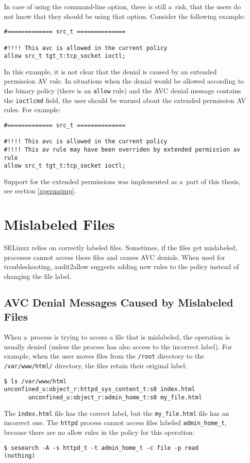 In case of using the command-line option, there is still a~risk, that the users
do not know that they should be using that option. Consider the following
example:
\begin{lstlisting}
#============= src_t ==============

#!!!! This avc is allowed in the current policy
allow src_t tgt_t:tcp_socket ioctl;
\end{lstlisting}
In this example, it is not clear that the denial is caused by an extended
permission AV rule. In situations when the denial would be allowed according to
the binary policy (there is an \texttt{allow} rule) and the AVC denial message
contains the \texttt{ioctlcmd} field, the user should be warned about the
extended permission AV rules. For example:
\begin{lstlisting}
#============= src_t ==============

#!!!! This avc is allowed in the current policy
#!!!! This av rule may have been overriden by extended permission av rule
allow src_t tgt_t:tcp_socket ioctl;
\end{lstlisting}
Support for the extended permissions was implemented as a~part of this thesis,
see section \ref{xpermsimp}.

\section{Mislabeled Files}
\label{mislabeled}
SELinux relies on correctly labeled files. Sometimes, if the files get
mislabeled, processes cannot access these files and causes AVC denials. When
used for troubleshooting, audit2allow suggests adding new rules to the policy
instead of changing the file label.

\subsection{AVC Denial Messages Caused by Mislabeled Files}
When a~process is trying to access a file that is mislabeled, the operation is
usually denied (unless the process has also access to the incorrect label). For
example, when the user moves files from the \texttt{/root} directory to the
\texttt{/var/www/html/} directory, the files retain their original label:
\begin{lstlisting}
$ ls /var/www/html
unconfined_u:object_r:httpd_sys_content_t:s0 index.html
       unconfined_u:object_r:admin_home_t:s0 my_file.html
\end{lstlisting}
The \texttt{index.html} file has the correct label, but the
\texttt{my\_file.html} file has an incorrect one. The \texttt{httpd} process
cannot access files labeled \texttt{admin\_home\_t}, because there are no allow
rules in the policy for this operation:
\begin{lstlisting}
$ sesearch -A -s httpd_t -t admin_home_t -c file -p read
(nothing)
\end{lstlisting}

